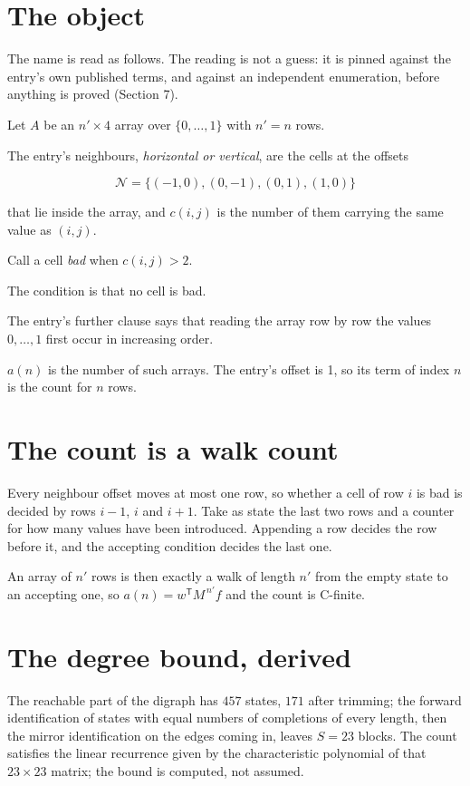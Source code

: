 \documentclass[11pt]{article}
\theoremstyle{definition}
\begin{document}
\section{The object}

The name is read as follows. The reading is not a guess: it is pinned against the entry's own published terms, and against an independent enumeration, before anything is proved (Section 7).

Let $A$ be an $n' \times 4$ array over $\{0,\dots,1\}$ with $n' = n$ rows.

The entry's neighbours, {\itshape horizontal or vertical}, are the cells at the offsets

\[\mathcal{N} = \{(-1,0), (0,-1), (0,1), (1,0)\}\]

that lie inside the array, and $c(i,j)$ is the number of them carrying the same value as $(i,j)$.

Call a cell {\itshape bad} when $c(i,j) > 2$.

The condition is that no cell is bad.

The entry's further clause says that reading the array row by row the values $0,\dots,1$ first occur in increasing order.

$a(n)$ is the number of such arrays. The entry's offset is 1, so its term of index $n$ is the count for $n$ rows.

\section{The count is a walk count}

Every neighbour offset moves at most one row, so whether a cell of row $i$ is bad is decided by rows $i-1$, $i$ and $i+1$. Take as state the last two rows and a counter for how many values have been introduced. Appending a row decides the row before it, and the accepting condition decides the last one.

An array of $n'$ rows is then exactly a walk of length $n'$ from the empty state to an accepting one, so $a(n) = w^{\mathsf T}M^{\,n'}f$ and the count is C-finite.

\section{The degree bound, derived}

The reachable part of the digraph has $457$ states, $171$ after trimming; the forward identification of states with equal numbers of completions of every length, then the mirror identification on the edges coming in, leaves $S = 23$ blocks. The count satisfies the linear recurrence given by the characteristic polynomial of that $23\times23$ matrix; the bound is computed, not assumed.
\end{document}
